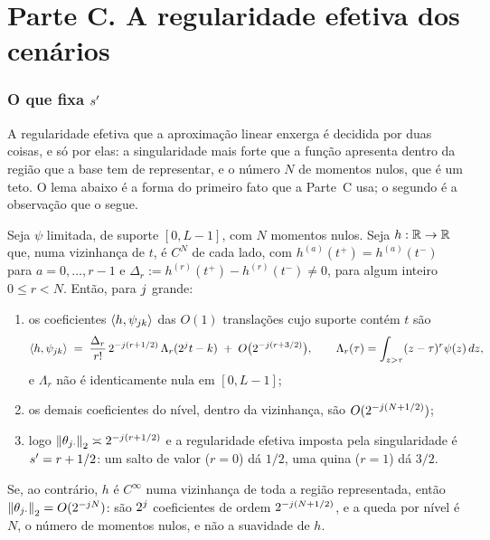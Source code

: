 \documentclass[11pt,a4paper]{article}
\begin{document}
\part*{Parte C. A regularidade efetiva dos cenários}

\section{O que fixa $s'$}

A regularidade efetiva que a aproximação linear enxerga é decidida por duas
coisas, e só por elas: a singularidade mais forte que a função apresenta
dentro da região que a base tem de representar, e o número $N$ de momentos
nulos, que é um teto. O lema abaixo é a forma do primeiro fato que a Parte~C usa; o
segundo é a observação que o segue.

\begin{lemma}\label{lem:ordem}
Seja $\psi$ limitada, de suporte $[0,L-1]$, com $N$ momentos nulos. Seja
$h:\mathbb{R}\to\mathbb{R}$ que, numa vizinhança de $t$, é $C^{N}$ de cada lado, com
$h^{(a)}(t^{+}) = h^{(a)}(t^{-})$ para $a = 0,\dots,r-1$ e
$\Delta_{r} := h^{(r)}(t^{+}) - h^{(r)}(t^{-}) \ne 0$, para algum inteiro
$0\le r< N$. Então, para $j$ grande:
\begin{enumerate}[label=\textup{(\roman*)}, leftmargin=*, nosep]
  \item os coeficientes $\langle h, \psi_{jk} \rangle$ das $O(1)$ translações
    cujo suporte contém $t$ são
    \[
      \langle h, \psi_{jk} \rangle \;=\;
      \frac{\Delta_{r}}{r!}\,2^{-j(r+1/2)}\,
      \Lambda_{r}(2^{j}t - k) \;+\; O\bigl(2^{-j(r+3/2)}\bigr),
      \qquad
      \Lambda_{r}(\tau) = \int_{z>\tau}(z-\tau)^{r}\psi(z)\,dz,
    \]
    e $\Lambda_{r}$ não é identicamente nula em $[0,L-1]$;
  \item os demais coeficientes do nível, dentro da vizinhança, são
    $O(2^{-j(N+1/2)})$;
  \item logo $\left\lVert \theta_{j\cdot} \right\rVert_{2}\asymp 2^{-j(r+1/2)}$ e a
    regularidade efetiva imposta pela singularidade é $s' = r + 1/2$: um
    salto de valor ($r = 0$) dá $1/2$, uma quina ($r = 1$) dá $3/2$.
\end{enumerate}
Se, ao contrário, $h$ é $C^{\infty}$ numa vizinhança de toda a região
representada, então $\left\lVert \theta_{j\cdot} \right\rVert_{2} = O(2^{-j N})$: são
$2^{j}$ coeficientes de ordem $2^{-j(N+1/2)}$, e a queda por nível é
$N$, o número de momentos nulos, e não a suavidade de $h$.
\end{lemma}
\end{document}
